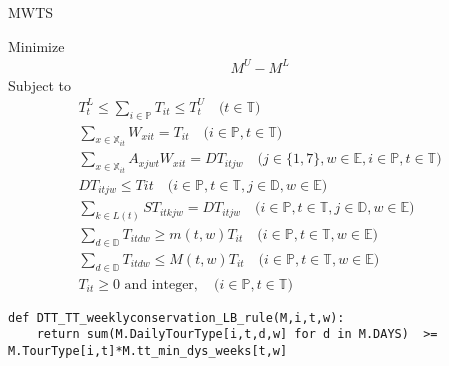 \documentclass{article}
\newcommand{\nipar}{\par\noindent\ignorespaces}
\begin{document}
\newpage
\nipar {\bf Model:} MWTS
\nipar
\nipar Minimize
\begin{gather}
M^{U} - M^{L} \label{eqn:obj} 
\end{gather}
Subject to
\begin{gather}
T^{L}_{t} \leq \sum_{i \in \mathbb{P}}T_{it} \leq T^{U}_{t} \quad \text{($t \in \mathbb{T}$)} \label{eqn:tt_ub} \\
%
\sum_{x \in \mathbb{X}_{it}}W_{xit} = T_{it} \quad \text{($i \in \mathbb{P}, t \in \mathbb{T}$)} \label{eqn:W_T_tot} \\
%
\sum_{x \in \mathbb{X}_{it}}A_{xjwt}W_{xit} = DT_{itjw} \quad \text{($j \in \{1,7\},w \in \mathbb{E},i \in \mathbb{P}, t \in \mathbb{T}$)} \label{eqn:WW_DT} \\
%
DT_{itjw} \leq T{it} \quad \text{($i \in \mathbb{P},t \in \mathbb{T},j \in \mathbb{D},w \in \mathbb{E}$)} \label{eqn:DT_T_dailyub} \\
%
\sum_{k \in L(t)}ST_{itkjw} = DT_{itjw} \quad \text{($i \in \mathbb{P},t \in \mathbb{T},j \in \mathbb{D},w \in \mathbb{E}$)} \label{eqn:ST_DT_dailyeq} \\
%
\sum_{d \in \mathbb{D}}T_{itdw} \geq m(t,w)T_{it} \quad \text{($i \in \mathbb{P},t \in \mathbb{T},w \in \mathbb{E}$)} \label{eqn:TT_T_weeklylb} \\
\sum_{d \in \mathbb{D}}T_{itdw} \leq M(t,w)T_{it} \quad \text{($i \in \mathbb{P},t \in \mathbb{T},w \in \mathbb{E}$)} \label{eqn:TT_T_weeklyub} \\
%
T_{it} \geq 0 \text{ and integer}, \quad \text{($i \in \mathbb{P}, t \in \mathbb{T}$)} \label{eqn:TT_int}
\end{gather} 



\begin{verbatim}
def DTT_TT_weeklyconservation_LB_rule(M,i,t,w):
    return sum(M.DailyTourType[i,t,d,w] for d in M.DAYS)  >= M.TourType[i,t]*M.tt_min_dys_weeks[t,w]
\end{verbatim}
\end{document}
